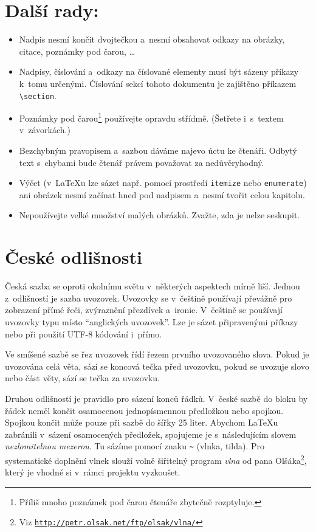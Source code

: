 \documentclass[twocolumn, a4paper]{article}
\begin{document}
\section{\textbf{Další rady:}}\label{3}
\begin{itemize}
\item Nadpis nesmí končit dvojtečkou a~nesmí obsahovat odkazy na obrázky, citace, poznámky pod čarou, \dots
\item Nadpisy, číslování a~odkazy na číslované elementy musí být sázeny příkazy k~tomu určenými.
Číslování sekcí tohoto dokumentu je zajištěno příkazem \verb|\section|.
\item Poznámky pod čarou\footnote{Příliš mnoho poznámek pod čarou čtenáře zbytečně rozptyluje.} používejte opravdu střídmě.
(Šetřete i~s~textem v~závorkách.)
\item Bezchybným pravopisem a~sazbou dáváme najevo úctu ke čtenáři.
Odbytý text s~chybami bude čtenář právem považovat za nedůvěryhodný.
\item Výčet (v~\LaTeX u lze sázet např. pomocí prostředí \texttt{itemize} nebo \texttt{enumerate}) ani obrázek nesmí začínat hned pod nadpisem a~nesmí tvořit celou kapitolu.
\item Nepoužívejte velké množství malých obrázků.
Zvažte, zda je nelze seskupit.
\end{itemize}

\section{\textbf{České odlišnosti}}
Česká sazba se oproti okolnímu světu v~některých aspektech mírně liší.
Jednou z~odlišností je sazba uvozovek.
Uvozovky se v~češtině používají převážně pro zobrazení přímé řeči, zvýraznění přezdívek a~ironie.
V~češtině se používají uvozovky typu  místo ``anglických uvozovek''.
Lze je sázet připravenými příkazy nebo při použití UTF-8 kódování i~přímo.

Ve smíšené sazbě se řez uvozovek řídí řezem prvního uvozovaného slova.
Pokud je uvozována celá věta, sází se koncová tečka před uvozovku, pokud se uvozuje slovo nebo část věty, sází se tečka za uvozovku.

Druhou odlišností je pravidlo pro sázení konců řádků.
V~české sazbě do bloku by řádek neměl končit osamocenou jednopísmennou předložkou nebo spojkou. Spojkou  končit může pouze při sazbě do šířky 25 liter.
Abychom \LaTeX u zabránili v~sázení osamocených předložek, spojujeme je s~následujícím slovem \emph{nezlomitelnou mezerou}.
Tu sázíme pomocí znaku \verb|~| (vlnka, tilda).
Pro systematické doplnění vlnek slouží volně šiřitelný program \emph{vlna} od pana Olšáka\footnote{Viz \href{http://petr.olsak.net/ftp/olsak/vlna/}{\texttt{http://petr.olsak.net/ftp/olsak/vlna/}}}, který je vhodné si v~rámci projektu vyzkoušet.
\end{document}
